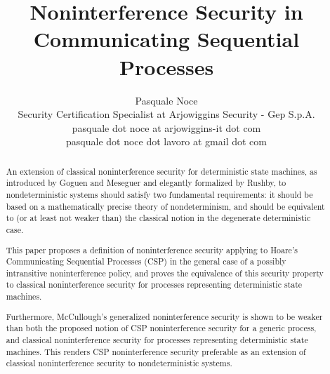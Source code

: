 \documentclass[11pt,a4paper]{article}
\begin{document}
\title{Noninterference Security in\\Communicating Sequential Processes}
\author{Pasquale Noce\\Security Certification Specialist at Arjowiggins Security - Gep S.p.A.\\pasquale dot noce at arjowiggins-it dot com\\pasquale dot noce dot lavoro at gmail dot com}
\maketitle

\begin{abstract}
An extension of classical noninterference security for deterministic state
machines, as introduced by Goguen and Meseguer and elegantly formalized by
Rushby, to nondeterministic systems should satisfy two fundamental requirements:
it should be based on a mathematically precise theory of nondeterminism, and
should be equivalent to (or at least not weaker than) the classical notion in
the degenerate deterministic case.

This paper proposes a definition of noninterference security applying to Hoare's
Communicating Sequential Processes (CSP) in the general case of a possibly
intransitive noninterference policy, and proves the equivalence of this security
property to classical noninterference security for processes representing
deterministic state machines.

Furthermore, McCullough's generalized noninterference security is shown to be
weaker than both the proposed notion of CSP noninterference security for a
generic process, and classical noninterference security for processes
representing deterministic state machines. This renders CSP noninterference
security preferable as an extension of classical noninterference security to
nondeterministic systems.
\end{abstract}

\tableofcontents





\end{document}
